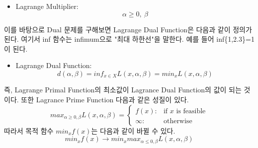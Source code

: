 \documentclass[a4paper]{oblivoir}
\begin{document}
\begin{itemize}\setlength\itemsep{-\parsep}
	\item Lagrange Multiplier:
	\begin{equation}
	\alpha\geq 0,\ \beta
	\label{eq:5-23}
	\end{equation}
\end{itemize}
이를 바탕으로 Dual 문제를 구해보면 Lagrange Dual Function은 다음과 같이 정의가 된다. 여기서 inf 함수는 infimum으로 "최대 하한선"을 말한다. 예를 들어 inf\{1,2.3\}=1 이 된다.
\begin{itemize}\setlength\itemsep{-\parsep}
	\item Lagrange Dual Function:
	\begin{equation}
	d(\alpha,\beta)=inf_{x\in X} L(x,\alpha,\beta)=min_x L(x,\alpha,\beta)
	\label{eq:5-24}
	\end{equation}
\end{itemize}
즉, Lagrange Primal Function의 최소값이 Lagrance Dual Function의 값이 되는 것이다. 또한 Lagrance Prime Function 다음과 같은 성질이 있다.
\begin{equation}
max_{\alpha\geq0,\beta}L(x,\alpha,\beta)=
\begin{cases}
f(x):&\mbox{if }x\mbox{ is feasible}\\
\infty:&\mbox{otherwise}
\end{cases}
\label{eq:5-25}
\end{equation}
따라서 목적 함수 $min_x f(x)$는 다음과 같이 바뀔 수 있다.
$$min_x f(x)\rightarrow min_x max_{\alpha\leq 0,\beta} L(x,\alpha,\beta)$$\\

\end{document}
